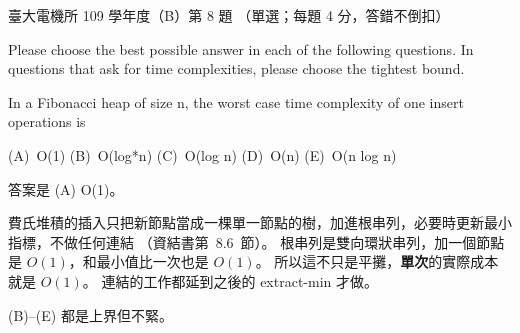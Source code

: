 \begin{pastexam}[label={px:ntu-109-ee-ds-08}]{臺大電機所 109 學年度（B）第 8 題}
（單選；每題 4 分，答錯不倒扣）

Please choose the best possible answer in each of the following questions. In questions that ask
for time complexities, please choose the tightest bound.

In a Fibonacci heap of size n, the worst case time complexity of one insert operations is

(A)~O(1) \qquad (B)~O(log*n) \qquad (C)~O(log n) \qquad (D)~O(n) \qquad (E)~O(n log n)
\end{pastexam}

\begin{pastsoln}
答案是 (A) O(1)。

費氏堆積的插入只把新節點當成一棵單一節點的樹，加進根串列，必要時更新最小指標，不做任何連結
（資結書第~8.6~節）。 根串列是雙向環狀串列，加一個節點是 $O(1)$，和最小值比一次也是 $O(1)$。
所以這不只是平攤，\textbf{單次}的實際成本就是 $O(1)$。 連結的工作都延到之後的 extract-min 才做。

(B)--(E) 都是上界但不緊。
\end{pastsoln}
